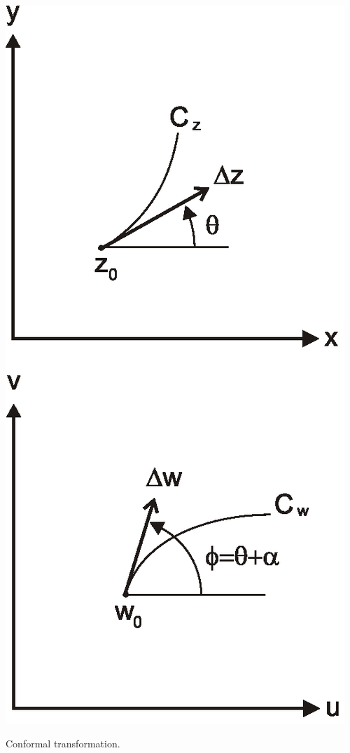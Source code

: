 \label{week3}


\begin{marginfigure}
\centering
\includegraphics{complex/figures/conformal_portrait}
\caption{Conformal transformation.}
\label{fig-conformal}
\end{marginfigure}

